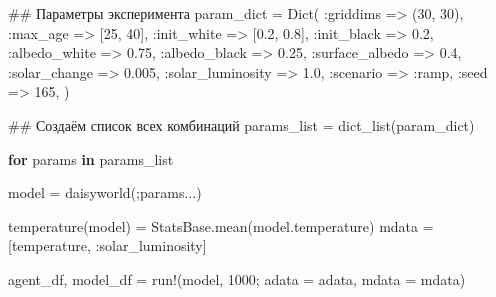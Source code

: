 \documentclass[
  english,
  russian,
  12pt,
  a4paper,
  DIV=11,
  numbers=noendperiod]{scrreprt}
\newenvironment{Shaded}{\begin{snugshade}}{\end{snugshade}}
\newcommand{\CommentTok}[1]{\textcolor[rgb]{0.37,0.37,0.37}{#1}}
\newcommand{\ControlFlowTok}[1]{\textcolor[rgb]{0.00,0.23,0.31}{\textbf{#1}}}
\newcommand{\FloatTok}[1]{\textcolor[rgb]{0.68,0.00,0.00}{#1}}
\newcommand{\FunctionTok}[1]{\textcolor[rgb]{0.28,0.35,0.67}{#1}}
\newcommand{\KeywordTok}[1]{\textcolor[rgb]{0.00,0.23,0.31}{\textbf{#1}}}
\newcommand{\NormalTok}[1]{\textcolor[rgb]{0.00,0.23,0.31}{#1}}
\newcommand{\OperatorTok}[1]{\textcolor[rgb]{0.37,0.37,0.37}{#1}}
\begin{document}
\begin{Shaded}
\begin{Highlighting}[]
\CommentTok{\#\# Параметры эксперимента}
\NormalTok{param\_dict }\OperatorTok{=} \FunctionTok{Dict}\NormalTok{(}
    \OperatorTok{:}\NormalTok{griddims }\OperatorTok{=\textgreater{}}\NormalTok{ (}\FloatTok{30}\NormalTok{, }\FloatTok{30}\NormalTok{),}
    \OperatorTok{:}\NormalTok{max\_age }\OperatorTok{=\textgreater{}}\NormalTok{ [}\FloatTok{25}\NormalTok{, }\FloatTok{40}\NormalTok{],}
    \OperatorTok{:}\NormalTok{init\_white }\OperatorTok{=\textgreater{}}\NormalTok{ [}\FloatTok{0.2}\NormalTok{, }\FloatTok{0.8}\NormalTok{],}
    \OperatorTok{:}\NormalTok{init\_black }\OperatorTok{=\textgreater{}} \FloatTok{0.2}\NormalTok{,}
    \OperatorTok{:}\NormalTok{albedo\_white }\OperatorTok{=\textgreater{}} \FloatTok{0.75}\NormalTok{,}
    \OperatorTok{:}\NormalTok{albedo\_black }\OperatorTok{=\textgreater{}} \FloatTok{0.25}\NormalTok{,}
    \OperatorTok{:}\NormalTok{surface\_albedo }\OperatorTok{=\textgreater{}} \FloatTok{0.4}\NormalTok{,}
    \OperatorTok{:}\NormalTok{solar\_change }\OperatorTok{=\textgreater{}} \FloatTok{0.005}\NormalTok{,}
    \OperatorTok{:}\NormalTok{solar\_luminosity }\OperatorTok{=\textgreater{}} \FloatTok{1.0}\NormalTok{,}
    \OperatorTok{:}\NormalTok{scenario }\OperatorTok{=\textgreater{}} \OperatorTok{:}\NormalTok{ramp,}
    \OperatorTok{:}\NormalTok{seed }\OperatorTok{=\textgreater{}} \FloatTok{165}\NormalTok{,}
\NormalTok{)}

\CommentTok{\#\# Создаём список всех комбинаций}
\NormalTok{params\_list }\OperatorTok{=} \FunctionTok{dict\_list}\NormalTok{(param\_dict)}

\ControlFlowTok{for}\NormalTok{ params }\KeywordTok{in}\NormalTok{ params\_list}

\NormalTok{    model }\OperatorTok{=} \FunctionTok{daisyworld}\NormalTok{(;params}\OperatorTok{...}\NormalTok{)}

    \FunctionTok{temperature}\NormalTok{(model) }\OperatorTok{=}\NormalTok{ StatsBase.}\FunctionTok{mean}\NormalTok{(model.temperature)}
\NormalTok{    mdata }\OperatorTok{=}\NormalTok{ [temperature, }\OperatorTok{:}\NormalTok{solar\_luminosity]}

\NormalTok{    agent\_df, model\_df }\OperatorTok{=} \FunctionTok{run!}\NormalTok{(model, }\FloatTok{1000}\NormalTok{; adata }\OperatorTok{=}\NormalTok{ adata, mdata }\OperatorTok{=}\NormalTok{ mdata)}


\end{Highlighting}
\end{Shaded}
\end{document}
